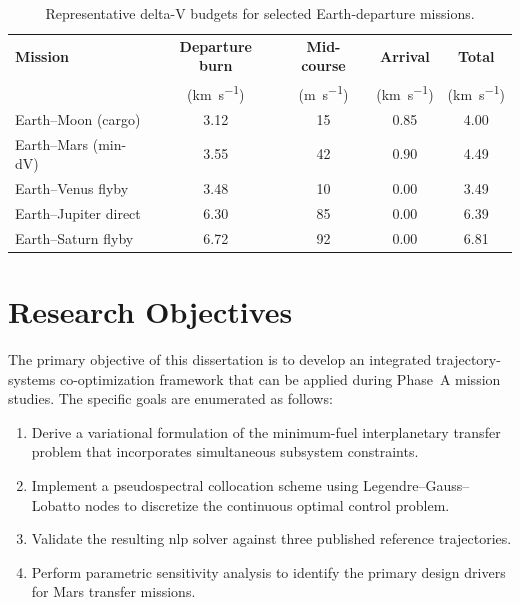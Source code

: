 \documentclass[dissertation, bookmarks]{../example/tex/grizz_thesis}
\begin{document}
\begin{table}[htbp]
  \caption{Representative delta-V budgets for selected Earth-departure missions.}
  \label{tab:ch1-deltav}
  \centering
  \begin{tabular}{lcccc}
    \toprule
    \textbf{Mission} & \textbf{Departure burn} & \textbf{Mid-course} & \textbf{Arrival} & \textbf{Total} \\
                     & (\si{\kilo\meter\per\second}) & (\si{\meter\per\second}) & (\si{\kilo\meter\per\second}) & (\si{\kilo\meter\per\second}) \\
    \midrule
    Earth--Moon (cargo)   & 3.12 & 15 & 0.85 & 4.00 \\
    Earth--Mars (min-dV)  & 3.55 & 42 & 0.90 & 4.49 \\
    Earth--Venus flyby    & 3.48 & 10 & 0.00 & 3.49 \\
    Earth--Jupiter direct & 6.30 & 85 & 0.00 & 6.39 \\
    Earth--Saturn flyby   & 6.72 & 92 & 0.00 & 6.81 \\
    \bottomrule
  \end{tabular}
\end{table}

\blindtext

\section{Research Objectives}

The primary objective of this dissertation is to develop an integrated trajectory-systems
co-optimization framework that can be applied during Phase~A mission studies. The specific goals are
enumerated as follows:

\begin{enumerate}
  \item Derive a variational formulation of the minimum-fuel interplanetary transfer problem that
        incorporates simultaneous subsystem constraints.
  \item Implement a pseudospectral collocation scheme using Legendre--Gauss--Lobatto nodes to
        discretize the continuous optimal control problem.
  \item Validate the resulting \gls{nlp} solver against three published reference trajectories.
  \item Perform parametric sensitivity analysis to identify the primary design drivers for Mars
        transfer missions.
\end{enumerate}
\end{document}
